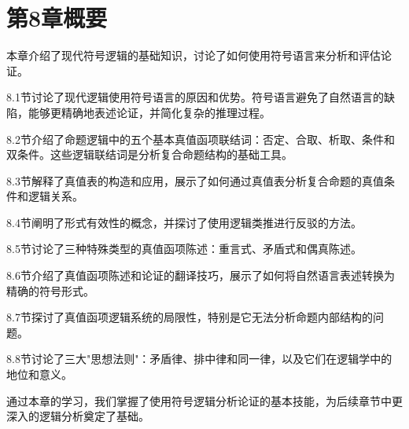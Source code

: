 \section{第8章概要}
本章介绍了现代符号逻辑的基础知识，讨论了如何使用符号语言来分析和评估论证。

8.1节讨论了现代逻辑使用符号语言的原因和优势。符号语言避免了自然语言的缺陷，能够更精确地表述论证，并简化复杂的推理过程。

8.2节介绍了命题逻辑中的五个基本真值函项联结词：否定、合取、析取、条件和双条件。这些逻辑联结词是分析复合命题结构的基础工具。

8.3节解释了真值表的构造和应用，展示了如何通过真值表分析复合命题的真值条件和逻辑关系。

8.4节阐明了形式有效性的概念，并探讨了使用逻辑类推进行反驳的方法。

8.5节讨论了三种特殊类型的真值函项陈述：重言式、矛盾式和偶真陈述。

8.6节介绍了真值函项陈述和论证的翻译技巧，展示了如何将自然语言表述转换为精确的符号形式。

8.7节探讨了真值函项逻辑系统的局限性，特别是它无法分析命题内部结构的问题。

8.8节讨论了三大"思想法则"：矛盾律、排中律和同一律，以及它们在逻辑学中的地位和意义。

通过本章的学习，我们掌握了使用符号逻辑分析论证的基本技能，为后续章节中更深入的逻辑分析奠定了基础。

\printbibliography[heading=subbibliography,title={第8章参考文献}] 